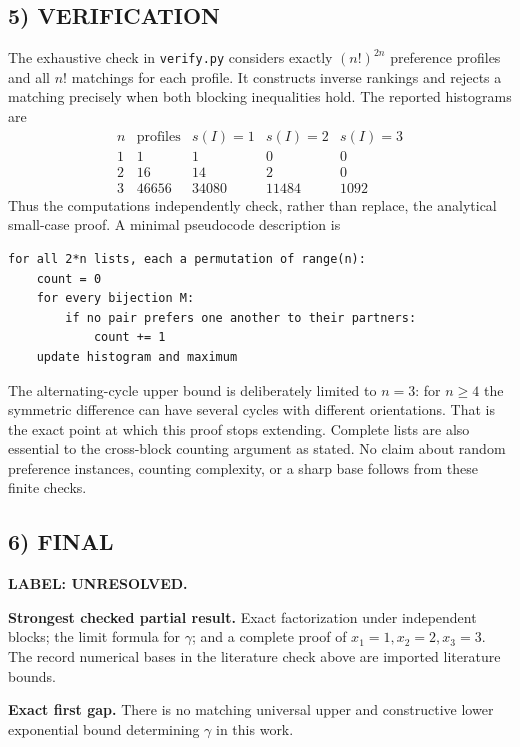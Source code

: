 \documentclass[11pt,a4paper]{article}
\theoremstyle{definition}
\theoremstyle{remark}
\begin{document}
\subsection*{5) VERIFICATION}
The exhaustive check in \texttt{verify.py} considers exactly $(n!)^{2n}$ preference
profiles and all $n!$ matchings for each profile. It constructs inverse rankings
and rejects a matching precisely when both blocking inequalities hold. The
reported histograms are
\[
\begin{array}{c|r|rrr}
 n&\text{profiles}&s(I)=1&s(I)=2&s(I)=3\\\hline
 1&1&1&0&0\\
 2&16&14&2&0\\
 3&46656&34080&11484&1092
\end{array}
\]
Thus the computations independently check, rather than replace, the analytical
small-case proof. A minimal pseudocode description is
\begin{lstlisting}
for all 2*n lists, each a permutation of range(n):
    count = 0
    for every bijection M:
        if no pair prefers one another to their partners:
            count += 1
    update histogram and maximum
\end{lstlisting}
The alternating-cycle upper bound is deliberately limited to $n=3$: for $n\geq4$
the symmetric difference can have several cycles with different orientations.
That is the exact point at which this proof stops extending. Complete lists are
also essential to the cross-block counting argument as stated. No claim about
random preference instances, counting complexity, or a sharp base follows from
these finite checks.

\subsection*{6) FINAL}
\textbf{LABEL: UNRESOLVED.}

\textbf{Strongest checked partial result.} Exact factorization under independent
blocks; the limit formula for $\gamma$; and a complete proof of $x_1=1,x_2=2,x_3=3$.
The record numerical bases in the literature check above are imported literature bounds.

\textbf{Exact first gap.} There is no matching universal upper and constructive
lower exponential bound determining $\gamma$ in this work.
\end{document}
